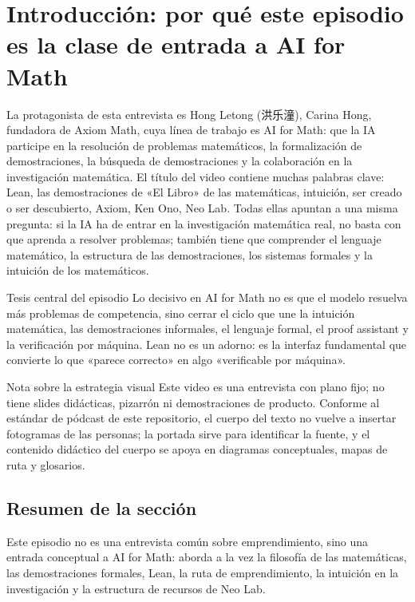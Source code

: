 \section{Introducción: por qué este episodio es la clase de entrada a AI for Math}

La protagonista de esta entrevista es Hong Letong (洪乐潼), Carina Hong, fundadora de Axiom Math, cuya línea de trabajo es AI for Math: que la IA participe en la resolución de problemas matemáticos, la formalización de demostraciones, la búsqueda de demostraciones y la colaboración en la investigación matemática. El título del video contiene muchas palabras clave: Lean, las demostraciones de «El Libro» de las matemáticas, intuición, ser creado o ser descubierto, Axiom, Ken Ono, Neo Lab. Todas ellas apuntan a una misma pregunta: si la IA ha de entrar en la investigación matemática real, no basta con que aprenda a resolver problemas; también tiene que comprender el lenguaje matemático, la estructura de las demostraciones, los sistemas formales y la intuición de los matemáticos.

\begin{importantbox}{Tesis central del episodio}
Lo decisivo en AI for Math no es que el modelo resuelva más problemas de competencia, sino cerrar el ciclo que une la intuición matemática, las demostraciones informales, el lenguaje formal, el proof assistant y la verificación por máquina. Lean no es un adorno: es la interfaz fundamental que convierte lo que «parece correcto» en algo «verificable por máquina».
\end{importantbox}

\begin{knowledgebox}{Nota sobre la estrategia visual}
Este video es una entrevista con plano fijo; no tiene slides didácticas, pizarrón ni demostraciones de producto. Conforme al estándar de pódcast de este repositorio, el cuerpo del texto no vuelve a insertar fotogramas de las personas; la portada sirve para identificar la fuente, y el contenido didáctico del cuerpo se apoya en diagramas conceptuales, mapas de ruta y glosarios.
\end{knowledgebox}

\subsection{Resumen de la sección}

Este episodio no es una entrevista común sobre emprendimiento, sino una entrada conceptual a AI for Math: aborda a la vez la filosofía de las matemáticas, las demostraciones formales, Lean, la ruta de emprendimiento, la intuición en la investigación y la estructura de recursos de Neo Lab.
